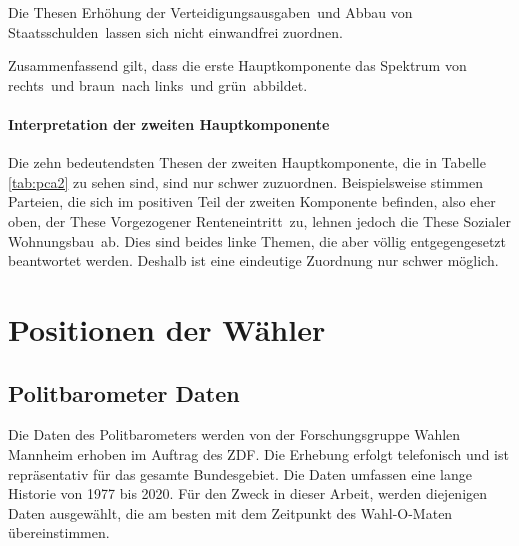 Die Thesen \glqq Erhöhung der Verteidigungsausgaben\grqq\ und \glqq Abbau von Staatsschulden\grqq\ lassen sich nicht einwandfrei zuordnen.

Zusammenfassend gilt, dass die erste Hauptkomponente das Spektrum von \glqq rechts\grqq\ und \glqq braun\grqq\ nach \glqq links\grqq\ und \glqq grün\grqq\ abbildet.

\paragraph{Interpretation der zweiten Hauptkomponente}
Die zehn bedeutendsten Thesen der zweiten Hauptkomponente, die in Tabelle \ref{tab:pca2} zu sehen sind, sind nur schwer zuzuordnen. Beispielsweise stimmen Parteien, die sich im positiven Teil der zweiten Komponente befinden, also eher oben, der These \glqq Vorgezogener Renteneintritt\grqq\ zu, lehnen jedoch die These \glqq Sozialer Wohnungsbau\grqq\ ab. Dies sind beides linke Themen, die aber völlig entgegengesetzt beantwortet werden. Deshalb ist eine eindeutige Zuordnung nur schwer möglich.

\section{Positionen der Wähler}\label{Sec-Wählerpositionen}

\subsection{Politbarometer Daten}
Die Daten des Politbarometers \citep{politbarometer} werden von der Forschungsgruppe Wahlen Mannheim erhoben im Auftrag des ZDF. Die Erhebung erfolgt telefonisch und ist repräsentativ für das gesamte Bundesgebiet. Die Daten umfassen eine lange Historie von 1977 bis 2020. Für den Zweck in dieser Arbeit, werden diejenigen Daten ausgewählt, die am besten mit dem Zeitpunkt des Wahl-O-Maten übereinstimmen.

